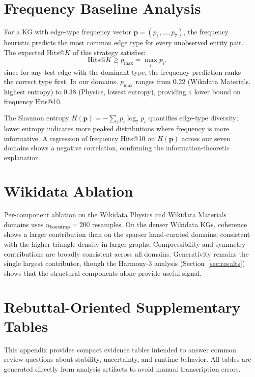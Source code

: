 \section{Frequency Baseline Analysis}\label{app:freq}

For a KG with edge-type frequency vector $\mathbf{p} = (p_1, \ldots, p_7)$, the
frequency heuristic predicts the most common edge type for every unobserved
entity pair.  The expected Hits@$K$ of this strategy satisfies:
\[
  \text{Hits@}K \geq p_{\max} = \max_i p_i,
\]
since for any test edge with the dominant type, the frequency prediction ranks
the correct type first.  In our domains, $p_{\max}$ ranges from 0.22 (Wikidata
Materials, highest entropy) to 0.38 (Physics, lowest entropy), providing a lower
bound on frequency Hits@10.

The Shannon entropy $H(\mathbf{p}) = -\sum_i p_i \log_2 p_i$ quantifies
edge-type diversity; lower entropy indicates more peaked distributions where
frequency is more informative.  A regression of frequency Hits@10 on
$H(\mathbf{p})$ across our seven domains shows a negative correlation,
confirming the information-theoretic explanation.

\section{Wikidata Ablation}\label{app:wikidata-ablation}

Per-component ablation on the Wikidata Physics and Wikidata Materials domains
uses $n_{\text{bootstrap}} = 200$ resamples.  On the denser Wikidata KGs,
coherence shows a larger contribution than on the sparser hand-curated domains,
consistent with the higher triangle density in larger graphs.  Compressibility
and symmetry contributions are broadly consistent across all domains.
Generativity remains the single largest contributor, though the Harmony-3
analysis (Section~\ref{sec:results}) shows that the structural components alone
provide useful signal.

\section{Rebuttal-Oriented Supplementary Tables}

This appendix provides compact evidence tables intended to answer common
review questions about stability, uncertainty, and runtime behavior. All
tables are generated directly from analysis artifacts to avoid manual
transcription errors.



